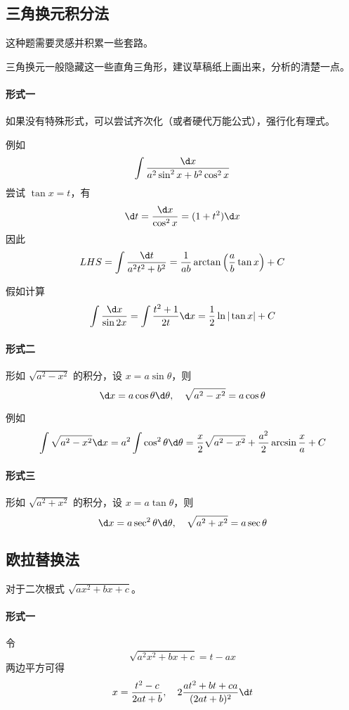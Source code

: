 \subsection{三角换元积分法}

这种题需要灵感并积累一些套路。

三角换元一般隐藏这一些直角三角形，建议草稿纸上画出来，分析的清楚一点。

\paragraph{形式一} 如果没有特殊形式，可以尝试齐次化（或者硬代万能公式），强行化有理式。

例如
\[ \int \frac{\d x}{a^2 \sin^2 x + b^2 \cos^2 x} \]
尝试 $\tan x = t$，有
\[ \d t = \frac{\d x}{\cos^2 x} = (1 + t^2) \d x \]
因此
\[ LHS = \int \frac{\d t}{a^2 t^2 + b^2} = \frac{1}{ab} \arctan \left( \frac{a}{b} \tan x \right) + C \]


假如计算
\[ \int \frac{\d x}{\sin 2x} = \int \frac{t^2+1}{2t} \d x = \frac{1}{2} \ln | \tan x| + C \]


\paragraph{形式二} 形如 $\sqrt{a^2 - x^2}$ 的积分，设 $x = a \sin \theta$，则
\[ \d x = a \cos \theta \d \theta, \quad \sqrt{a^2 - x^2} = a \cos \theta \]

例如
\[ \int \sqrt{a^2 - x^2} \d x = a^2 \int \cos^2 \theta \d \theta = \frac{x}{2}\sqrt{a^2 - x^2} + \frac{a^2}{2} \arcsin \frac{x}{a} + C \]

\paragraph{形式三} 形如 $\sqrt{a^2 + x^2}$ 的积分，设 $x = a \tan \theta$，则
\[ \d x = a \sec^2 \theta \d \theta, \quad \sqrt{a^2+x^2} = a \sec \theta \]


\subsection{欧拉替换法}

对于二次根式 $\sqrt{a x^2 + b x + c}$。

\paragraph{形式一} 令
\[ \sqrt{a^2x^2+bx+c} = t - ax \]
两边平方可得
\[ x = \frac{t^2 - c}{2at + b}, \quad 2\frac{at^2 + bt + ca}{(2at+b)^2} \d t \]
